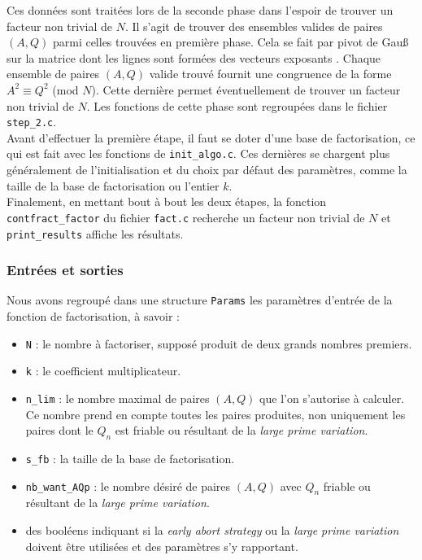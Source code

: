 Ces données sont traitées lors de la seconde phase dans l'espoir de trouver un
facteur non trivial de $N$. Il s'agit de trouver des ensembles valides de
paires $(A, Q)$ parmi celles trouvées en première phase. Cela se fait par pivot
de Gau\ss{} sur la matrice dont les lignes sont formées des vecteurs exposants
. Chaque ensemble de paires $(A, Q)$ valide trouvé fournit une
congruence de la forme $A^2 \equiv Q^2$ (mod $N$). Cette dernière permet
éventuellement de trouver un facteur non trivial de $N$. Les fonctions de cette
phase sont regroupées dans le fichier \texttt{step\_2.c}. \\

Avant d'effectuer la première étape, il faut se doter d'une base de
factorisation, ce qui est fait avec les fonctions de \texttt{init\_algo.c}.
Ces dernières se chargent plus généralement de l'initialisation et du choix par
défaut des paramètres, comme la taille de la base de factorisation ou l'entier
$k$. \\

Finalement, en mettant bout à bout les deux étapes, la fonction 
\texttt{contfract\_factor} du fichier \texttt{fact.c} recherche un facteur
non trivial de $N$ et \texttt{print\_results} affiche les résultats. 

\subsubsection{Entrées et sorties}

Nous avons regroupé dans une structure \texttt{Params} les paramètres d'entrée
de la fonction de factorisation, à savoir :

\begin{itemize}
	\item \texttt{N} : le nombre à factoriser, supposé produit de deux grands
	nombres premiers.
    \item \texttt{k} : le coefficient multiplicateur.
	\item \texttt{n\_lim} : le nombre maximal de paires $(A,Q)$ que l'on
	s'autorise à calculer. Ce nombre prend en compte toutes les paires
	produites, non uniquement les paires dont le $Q_n$ est friable ou résultant
	de la \textit{large prime variation}.
    \item \texttt{s\_fb} : la taille de la base de factorisation. 
	\item \texttt{nb\_want\_AQp} : le nombre désiré de paires $(A,Q)$ avec
	$Q_n$ friable ou résultant de la \textit{large prime variation}.
	\item des booléens indiquant si la \textit{early abort strategy} ou la
	\textit{large prime variation} doivent être utilisées et des paramètres s'y
	rapportant.
\end{itemize}

